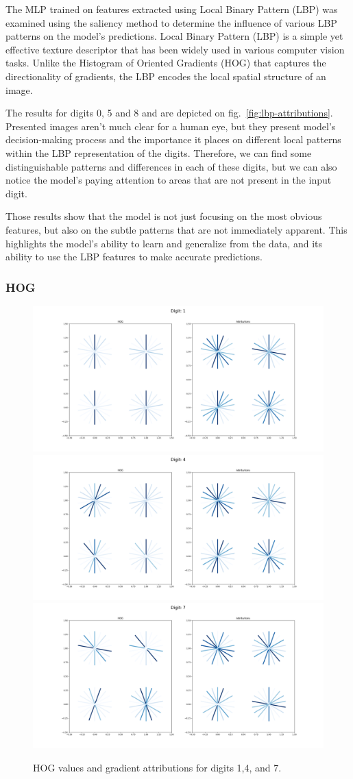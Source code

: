 \documentclass[journal, a4paper]{IEEEtran}
\begin{document}
The MLP trained on features extracted using Local Binary Pattern (LBP) was examined using the saliency method to determine the influence of various LBP patterns on the model's predictions.
Local Binary Pattern (LBP) is a simple yet effective texture descriptor that has been widely used in various computer vision tasks.
Unlike the Histogram of Oriented Gradients (HOG) that captures the directionality of gradients, the LBP encodes the local spatial structure of an image.

The results for digits 0, 5 and 8 and are depicted on fig.~\ref{fig:lbp-attributions}.
Presented images aren't much clear for a human eye, but they present model's decision-making process and the importance it places on different local patterns within the LBP representation of the digits.
Therefore, we can find some distinguishable patterns and differences in each of these digits, but we can also notice the model's paying attention to areas that are not present in the input digit.

Those results show that the model is not just focusing on the most obvious features, but also on the subtle patterns that are not immediately apparent.
This highlights the model's ability to learn and generalize from the data, and its ability to use the LBP features to make accurate predictions.

\subsubsection{HOG}

\begin{figure}[ht]\centering
    \includegraphics[width=.6\linewidth]{img/saliency_hog/1.png}
    \includegraphics[width=.6\linewidth]{img/saliency_hog/4.png}
    \includegraphics[width=.6\linewidth]{img/saliency_hog/7.png}
    \caption{HOG values and gradient attributions for digits 1,4, and 7.}\label{fig:hog-attributions}
\end{figure}
\end{document}
